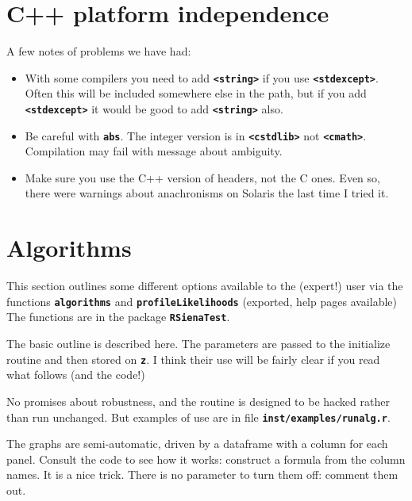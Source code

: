 \documentclass[12pt, a4paper]{article}
\renewcommand{\=}{\,=\,}
\newcommand{\+}{\,+\,}
\newcommand{\sfn}[1]{\textbf{\texttt{#1}}}
\begin{document}
\section{C++ platform independence}
A few notes of problems we have had:
\begin{itemize}
\item With some compilers you need to add \sfn{<string>} if you use
  \sfn{<stdexcept>}. Often this will be included somewhere else in the path, but
  if you add \sfn{<stdexcept>} it would be good to add \sfn{<string>} also.
  \item Be careful with \sfn{abs}. The integer version is in \sfn{<cstdlib>} not
    \sfn{<cmath>}. Compilation may fail with message about ambiguity.
\item Make sure you use the C++ version of headers, not the C ones. Even so,
  there were warnings about anachronisms on Solaris the last time I tried it.
\end{itemize}
\section{Algorithms}
This section outlines some different options available to the (expert!) user via
the functions \sfn{algorithms} and \sfn{profileLikelihoods} (exported, help
pages available) The functions are in the
  package \sfn{RSienaTest}.

  The basic outline is described here. The parameters are passed to the
  initialize routine and then stored on \sfn{z}. I think their use will be
  fairly clear if you read what follows (and the code!)

No promises about robustness, and the routine is designed to be hacked rather
than run unchanged. But examples of use are in file \sfn{inst/examples/runalg.r}.

The graphs are semi-automatic, driven by a dataframe with a column for each
panel. Consult the code to see how it works: construct a formula from the column
names. It is a nice trick. There is no parameter to turn them off: comment them
out.

\sfn{}
\end{document}
